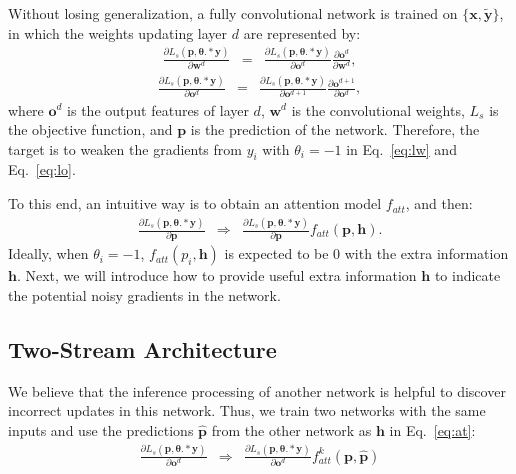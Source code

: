 \documentclass[letterpaper]{article} %
\begin{document}
Without losing generalization, a fully convolutional network is trained on $\{\boldsymbol{x},\widetilde{\boldsymbol{y}}\}$, in which the weights updating layer $d$ are represented by:
\begin{eqnarray}\label{eq:lw}
\frac{\partial L_s(\boldsymbol{p},\bm{\theta}.*\boldsymbol{y})}{\partial \boldsymbol{w}^d} &=& \frac{\partial L_s(\boldsymbol{p},\bm{\theta}.*\boldsymbol{y})}{\partial \boldsymbol{o}^{d}}\frac{\partial\boldsymbol{o}^{d}}{\partial\boldsymbol{w}^{d}},
\end{eqnarray}\begin{eqnarray}\label{eq:lo}
\frac{\partial L_s(\boldsymbol{p},\bm{\theta}.*\boldsymbol{y})}{\partial \boldsymbol{o}^d} &=& \frac{\partial L_s(\boldsymbol{p},\bm{\theta}.*\boldsymbol{y})}{\partial \boldsymbol{o}^{d+1}}\frac{\partial\boldsymbol{o}^{d+1}}{\partial\boldsymbol{o}^{d}},
\end{eqnarray}
where  $\boldsymbol{o}^d$ is the output features of layer $d$, $\boldsymbol{w}^d$ is the convolutional weights, $L_s$ is the objective function, and $\boldsymbol{p}$ is the prediction of the network.
Therefore, the target is to weaken the gradients from $y_i$ with $\theta_i=-1$ in Eq.~\eqref{eq:lw} and Eq.~\eqref{eq:lo}.

To this end, an intuitive way is to obtain an attention model $f_{att}$, and then:
\begin{eqnarray}\label{eq:at}
\frac{\partial L_s(\boldsymbol{p},\bm{\theta}.*\boldsymbol{y})}{\partial \boldsymbol{p}} &\Rightarrow& \frac{\partial L_s(\boldsymbol{p},\bm{\theta}.*\boldsymbol{y})}{\partial \boldsymbol{p}}f_{att}(\boldsymbol{p},\boldsymbol{h}).
\end{eqnarray}
Ideally, when $\theta_i=-1$, $f_{att}(p_i,\boldsymbol{h})$ is expected to be $0$ with the extra information $\boldsymbol{h}$.
Next, we will introduce how to provide useful extra information $\boldsymbol{h}$ to indicate the potential noisy gradients in the network.

\subsection{Two-Stream Architecture}
We believe that the inference processing of another network is helpful to discover incorrect updates in this network.
Thus, we train two networks with the same inputs and use the predictions $\widehat{\boldsymbol{p}}$ from the other network as $\boldsymbol{h}$ in Eq.~\eqref{eq:at}:
\begin{eqnarray}\label{eq:at3}
\frac{\partial L_s(\boldsymbol{p},\bm{\theta}.*\boldsymbol{y})}{\partial \boldsymbol{o}^d} &\Rightarrow& \frac{\partial L_s(\boldsymbol{p},\bm{\theta}.*\boldsymbol{y})}{\partial \boldsymbol{o}^d}f_{att}^k(\boldsymbol{p},\widehat{\boldsymbol{p}})
\end{eqnarray}
\end{document}
